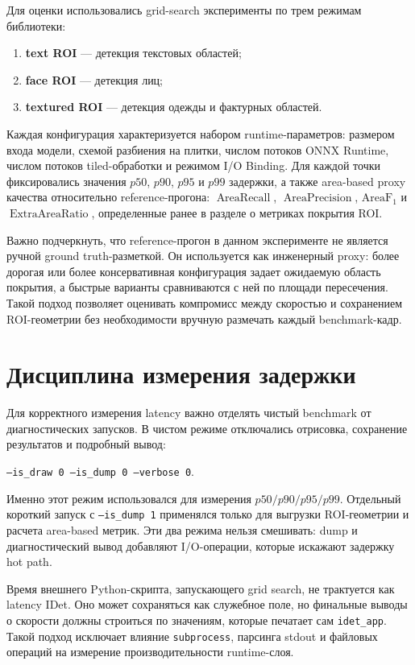 \documentclass[12pt,a4paper,oneside,openany]{report}
\newcommand{\important}[1]{\textbf{#1}}
\begin{document}
Для оценки использовались grid-search эксперименты по трем режимам библиотеки:
\begin{enumerate}[label=\arabic*)]
  \item \important{text ROI} --- детекция текстовых областей;
  \item \important{face ROI} --- детекция лиц;
  \item \important{textured ROI} --- детекция одежды и фактурных областей.
\end{enumerate}

Каждая конфигурация характеризуется набором runtime-параметров: размером входа модели, схемой
разбиения на плитки, числом потоков ONNX Runtime, числом потоков tiled-обработки и режимом I/O
Binding. Для каждой точки фиксировались значения $p50$, $p90$, $p95$ и $p99$ задержки, а также
area-based proxy качества относительно reference-прогона: $\operatorname{AreaRecall}$,
$\operatorname{AreaPrecision}$, $\operatorname{AreaF_1}$ и $\operatorname{ExtraAreaRatio}$,
определенные ранее в разделе о метриках покрытия ROI.

Важно подчеркнуть, что reference-прогон в данном эксперименте не является ручной ground
truth-разметкой. Он используется как инженерный proxy: более дорогая или более консервативная
конфигурация задает ожидаемую область покрытия, а быстрые варианты сравниваются с ней по площади
пересечения. Такой подход позволяет оценивать компромисс между скоростью и сохранением
ROI-геометрии без необходимости вручную размечать каждый benchmark-кадр.


\section{Дисциплина измерения задержки}

Для корректного измерения latency важно отделять чистый benchmark от диагностических запусков. В
чистом режиме отключались отрисовка, сохранение результатов и подробный вывод:
\begin{center}
  \texttt{--is\_draw 0 --is\_dump 0 --verbose 0}.
\end{center}
Именно этот режим использовался для измерения $p50/p90/p95/p99$. Отдельный короткий запуск с
\texttt{--is\_dump 1} применялся только для выгрузки ROI-геометрии и расчета area-based метрик.
Эти два режима нельзя смешивать: dump и диагностический вывод добавляют I/O-операции, которые
искажают задержку hot path.

Время внешнего Python-скрипта, запускающего grid search, не трактуется как latency IDet. Оно
может сохраняться как служебное поле, но финальные выводы о скорости должны строиться по
значениям, которые печатает сам \texttt{idet\_app}. Такой подход исключает влияние
\texttt{subprocess}, парсинга stdout и файловых операций на измерение производительности
runtime-слоя.
\end{document}
